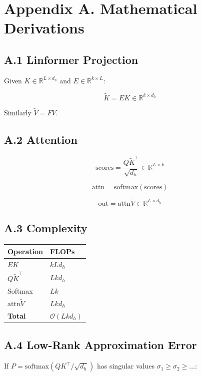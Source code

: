\section{Appendix A. Mathematical Derivations}

\subsection{A.1 Linformer Projection}

Given $K \in \mathbb{R}^{L \times d_h}$ and $E \in \mathbb{R}^{k \times L}$:

\[
\tilde{K} = E K \in \mathbb{R}^{k \times d_h}
\tag{A.1}
\]

Similarly $\tilde{V} = F V$.

\subsection{A.2 Attention}

\[
\text{scores} = \frac{Q \tilde{K}^\top}{\sqrt{d_h}} \in \mathbb{R}^{L \times k}
\tag{A.2}
\]

\[
\text{attn} = \text{softmax}(\text{scores})
\tag{A.3}
\]

\[
\text{out} = \text{attn} \tilde{V} \in \mathbb{R}^{L \times d_h}
\tag{A.4}
\]

\subsection{A.3 Complexity}

\begin{table}[H]
\centering
\small
\begin{tabular}{ll}
\toprule
\textbf{Operation} & \textbf{FLOPs} \\
\midrule
$E K$ & $k L d_h$ \\
$Q \tilde{K}^\top$ & $L k d_h$ \\
Softmax & $L k$ \\
$\text{attn} \tilde{V}$ & $L k d_h$ \\
\textbf{Total} & $\mathcal{O}(L k d_h)$ \\
\bottomrule
\end{tabular}
\end{table}

\subsection{A.4 Low-Rank Approximation Error}

If $P = \text{softmax}(QK^\top/\sqrt{d_h})$ has singular values $\sigma_1 \geq \sigma_2 \geq \dots$:

